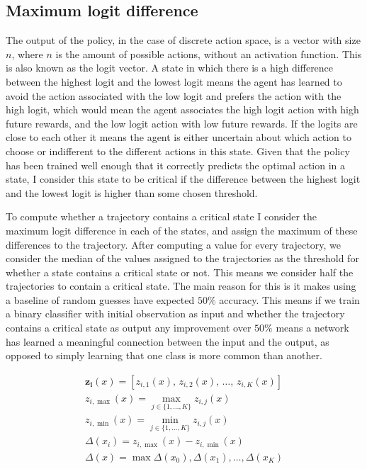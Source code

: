 \documentclass[UKenglish]{uiomasterthesis}
\begin{document}
\subsection{Maximum logit difference}
\label{sec:mld}
The output of the policy, in the case of discrete action space, is a vector with size $n$, where $n$ is the amount of possible actions, without an activation function. This is also known as the logit vector. A state in which there is a high difference between the highest logit and the lowest logit means the agent has learned to avoid the action associated with the low logit and prefers the action with the high logit, which would mean the agent associates the high logit action with high future rewards, and the low logit action with low future rewards. If the logits are close to each other it means the agent is either uncertain about which action to choose or indifferent to the different actions in this state. Given that the policy has been trained well enough that it correctly predicts the optimal action in a state, I consider this state to be critical if the difference between the highest logit and the lowest logit is higher than some chosen threshold.

To compute whether a trajectory contains a critical state I consider the maximum logit difference in each of the states, and assign the maximum of these differences to the trajectory. After computing a value for every trajectory, we consider the median of the values assigned to the trajectories as the threshold for whether a state contains a critical state or not. This means we consider half the trajectories to contain a critical state. The main reason for this is it makes using a baseline of random guesses have expected $50\%$ accuracy. This means if we train a binary classifier with initial observation as input and whether the trajectory contains a critical state as output any improvement over $50\%$ means a network has learned a meaningful connection between the input and the output, as opposed to simply learning that one class is more common than another.

\begin{gather*}
    \mathbf{z_i}(x) = \left[z_{i,1}(x),\, z_{i,2}(x),\, \dots,\, z_{i,K}(x)\right]\\
    z_{i,\max}(x) = \max_{j \in \{1,\dots,K\}} z_{i,j}(x)\\
    z_{i,\min}(x) = \min_{j \in \{1,\dots,K\}} z_{i,j}(x)\\
\Delta(x_i) = z_{i,\max}(x) - z_{i,\min}(x)\\
\Delta(x) = \max{\Delta(x_0),\Delta(x_1), \dots, \Delta(x_K)}
\end{gather*}
\end{document}
